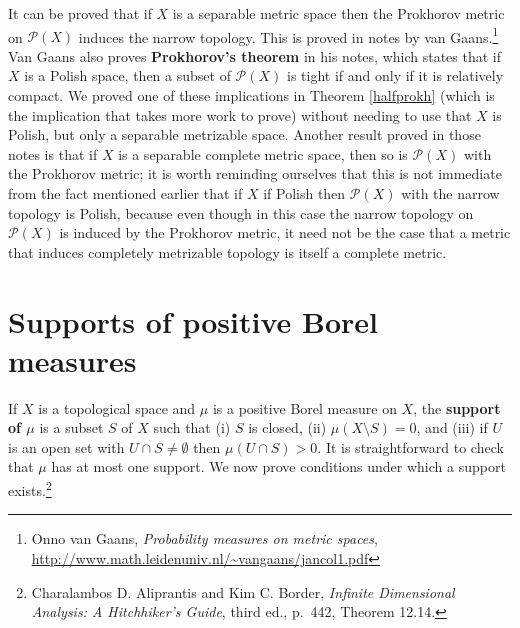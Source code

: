 \documentclass{article}
\theoremstyle{definition}
\theoremstyle{definition}
\begin{document}
It can be proved that if $X$ is a separable metric space then the Prokhorov metric on $\mathscr{P}(X)$ induces the 
narrow topology. This is proved in notes by  van Gaans.\footnote{Onno van Gaans, {\em Probability measures on metric spaces},
\url{http://www.math.leidenuniv.nl/~vangaans/jancol1.pdf}} Van Gaans also proves \textbf{Prokhorov's theorem} in his notes,
which states that if $X$ is a Polish space, then a subset of $\mathscr{P}(X)$ is tight if and only if it is relatively compact. We proved
one of these implications in Theorem \ref{halfprokh} (which is the implication that takes more work to prove) without needing to use that $X$ is Polish, but only a separable metrizable space.
Another result proved in those notes is that if $X$  is a separable complete metric space, then so is $\mathscr{P}(X)$ with the Prokhorov metric; it is worth
reminding ourselves that this is not immediate from the fact mentioned earlier that if $X$ if Polish then $\mathscr{P}(X)$ with the narrow topology is Polish,
because even though in this case the narrow topology on $\mathscr{P}(X)$ is induced by the Prokhorov metric, it need not be the case that 
a metric that induces completely metrizable topology is itself a complete metric.

\section{Supports of positive Borel measures}
If $X$ is a topological space
and $\mu$ is a positive Borel measure on $X$, the
\textbf{support of $\mu$} is a subset $S$ of $X$ such that (i) $S$ is closed, (ii)
$\mu(X \setminus S)=0$, and (iii) if $U$ is an open set
with $U \cap S \neq \emptyset$ then $\mu(U \cap S)>0$. 
It is straightforward to check that $\mu$ has at most one support.
We now prove conditions under which a support exists.\footnote{Charalambos D. Aliprantis and Kim C. Border,
{\em Infinite Dimensional Analysis: A Hitchhiker's Guide}, third ed., p.~442, Theorem 12.14.}
\end{document}
